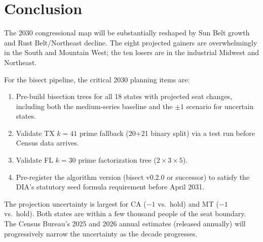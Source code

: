 \section{Conclusion}

The 2030 congressional map will be substantially reshaped by Sun Belt growth
and Rust Belt/Northeast decline.
The eight projected gainers are overwhelmingly in the South and Mountain West;
the ten losers are in the industrial Midwest and Northeast.

For the bisect pipeline, the critical 2030 planning items are:
\begin{enumerate}
  \item Pre-build bisection trees for all 18 states with projected seat changes,
    including both the medium-series baseline and the $\pm1$ scenario for
    uncertain states.
  \item Validate TX $k=41$ prime fallback (20+21 binary split) via a test run
    before Census data arrives.
  \item Validate FL $k=30$ prime factorization tree ($2\times3\times5$).
  \item Pre-register the algorithm version (bisect v0.2.0 or successor) to
    satisfy the DIA's statutory seed formula requirement before April 2031.
\end{enumerate}

The projection uncertainty is largest for CA ($-1$ vs.\ hold) and MT ($-1$
vs.\ hold). Both states are within a few thousand people of the seat boundary.
The Census Bureau's 2025 and 2026 annual estimates (released annually) will
progressively narrow the uncertainty as the decade progresses.
